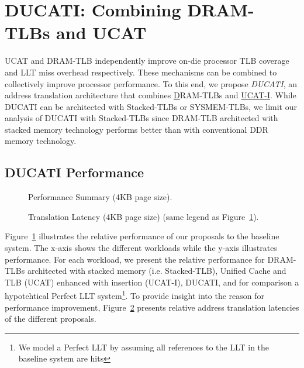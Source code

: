 \section{DUCATI: Combining DRAM-TLBs \newline and UCAT}
\label{sec:DUCATI}

\noindent UCAT and DRAM-TLB independently improve on-die
processor TLB coverage and LLT miss overhead respectively. These
mechanisms can be combined to collectively improve processor
performance. To this end, we propose {\em DUCATI}, an address
translation architecture that combines \underline{D}RAM-TLBs and
\underline{UCAT-I}. While DUCATI can be architected with Stacked-TLBs
or SYSMEM-TLBs, we limit our analysis of DUCATI with Stacked-TLBs
since DRAM-TLB architected with stacked memory technology performs
better than with conventional DDR memory technology.

\subsection{DUCATI Performance}

\begin{figure}[tp] 
\vspace{-0 in} \centering
\centerline{}

\caption{\small Performance Summary (4KB page size).\normalsize}
\label{fig:summary_4k_pages_perf} 
\vspace{0.1 in}
\end{figure}

\begin{figure}[tp] 
\vspace{0.1 in} \centering
\centerline{}

\caption{\small Translation Latency (4KB page size) (same legend as
  Figure~\ref{fig:summary_4k_pages_perf}).\normalsize}
\label{fig:summary_4k_pages_lat} 
\vspace{-0. in}
\end{figure}

\noindent Figure~\ref{fig:summary_4k_pages_perf} illustrates the
relative performance of our proposals to the baseline system. The
x-axis shows the different workloads while the y-axis illustrates
performance. For each workload, we present the relative performance
for DRAM-TLBs architected with stacked memory (i.e. Stacked-TLB),
Unified Cache and TLB (UCAT) enhanced with insertion (UCAT-I), DUCATI,
and for comparison a hypotehtical Perfect LLT system\footnote{We model
a Perfect LLT by assuming all references to the LLT in the baseline
system are hits}. To provide insight into the reason for performance
improvement, Figure~\ref{fig:summary_4k_pages_lat} presents relative
address translation latencies of the different proposals.

